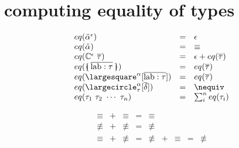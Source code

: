 \documentclass[11pt,a4paper]{article}
\newcommand{\nbkey}[1]{\textrm{#1}}
\newcommand{\record}[1]{\{\!\!\shortmid #1 \shortmid\!\!\}}
\newcommand{\overld}[3]{\largecircle^{#1}_{#2}{#3}}
\newcommand{\irecrd}[2]{\largesquare^{#1}{#2}}
\newcommand{\lab}{\nbkey{lab}}
\newcommand{\rigdvar}[1]{\ddot{#1}}
\newcommand{\flexvar}[1]{\tilde#1}
\newcommand{\tycon}{\mathbb{C}}
\newcommand{\type}{\tau}
\newcommand{\scheme}{\delta}
\newcommand{\equality}{\epsilon}
\newcommand{\eqyes}{\equiv}
\newcommand{\eqnot}{\nequiv}
\begin{document}
\section {computing equality of types}
\begin{minipage}{0.7\textwidth}
\[\begin{array}{lcl}
eq(\rigdvar{\alpha}^\equality) 						&=& \equality \\
eq(\flexvar{\alpha})                                &=& \eqyes    \\
eq(\tycon^\equality\ \overline\type) 				&=& \equality + eq(\overline\type) \\
eq(\record{\overline{\lab:\type}})			        &=& eq(\overline\type)    \\
eq(\irecrd{\alpha}{[\overline{\lab:\type}]})	    &=& eq(\overline\type)    \\
eq(\overld{\alpha}{\type}{[\overline\scheme]})		&=& \eqnot                \\
eq(\type_1\ \type_2\ \cdots\ \type_n)			    &=& \sum_i^n eq(\type_i)  \\
\end{array}\]
\end{minipage}
\begin{minipage}{0.3\textwidth}
\[\begin{array}{ccccccccl}
\eqyes &+& \eqyes &=& \eqyes \\
\eqnot &+& \eqnot &=& \eqnot \\
\eqyes &+& \eqnot &=& \eqnot &+& \eqyes &=& \eqnot \\
\\ \\ \\ \\ \\
\end{array}\]
\end{minipage}
\end{document}
